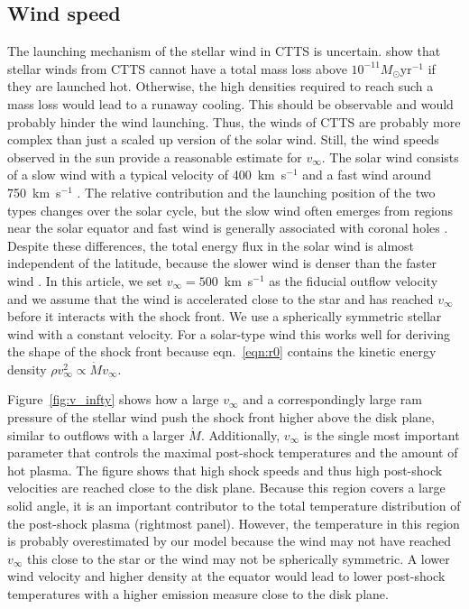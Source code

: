 \subsection{Wind speed}
The launching mechanism of the stellar wind in CTTS is uncertain. \citet{2007IAUS..243..299M} show that stellar winds from CTTS cannot have a total mass loss above $10^{-11}M_\odot\mathrm{ yr}^{-1}$ if they are launched hot. Otherwise, the high densities required to reach such a mass loss would lead to a runaway cooling. 
This should be observable and would probably hinder the wind  launching. Thus, the winds of CTTS are probably more complex than just a scaled up version of the solar wind. Still, the wind speeds observed in the sun provide a reasonable estimate for $v_\infty$. The solar wind consists of a slow wind with a typical velocity of 400~km~s$^{-1}$ and a fast wind around 750~km~s$^{-1}$ \citep{2005JGRA..110.7109F}. The relative contribution and the launching position of the two types changes over the solar cycle, but the slow wind often emerges from regions near the solar equator and fast wind is generally associated with coronal holes \citep{1999GeoRL..26.2901G,2003A&A...408.1165B,2009LRSP....6....3C}. Despite these differences, the total energy flux in the solar wind is almost independent of the latitude, because the slower wind is denser than the faster wind \citep{2012SoPh..279..197L}. In this article, we set $v_\infty=500$~km~s$^{-1}$ as the fiducial outflow velocity and we assume that the wind is accelerated close to the star and has reached $v_\infty$ before it interacts with the shock front. We use a spherically symmetric stellar wind with a constant velocity. For a solar-type wind this works well for deriving the shape of the shock front because eqn.~\ref{eqn:r0} contains the kinetic energy density $\rho v^2_\infty \propto \dot M v_\infty$. 



Figure~\ref{fig:v_infty} shows how a large $v_\infty$ and a correspondingly large ram pressure of the stellar wind push the shock front higher above the disk plane, similar to outflows with a larger $\dot M$. Additionally, $v_\infty$ is the single most important parameter that controls the maximal post-shock temperatures and the amount of hot plasma.
The figure shows that high shock speeds and thus high post-shock velocities are reached close to the disk plane. Because this region covers a large solid angle, it is an important contributor to the total temperature distribution of the post-shock plasma (rightmost panel). However, the temperature in this region is probably overestimated by our model because the wind may not have reached $v_\infty$ this close to the star or the wind may not be spherically symmetric. A lower wind velocity and higher density at the equator would lead to lower post-shock temperatures with a higher emission measure close to the disk plane.
